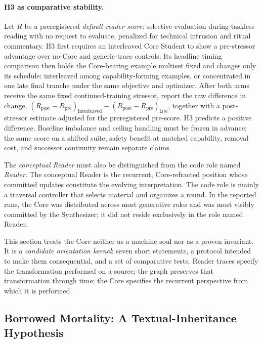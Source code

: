 \paragraph{H3 as comparative stability.} Let $R$ be a preregistered
\emph{default-reader score}: selective evaluation during taskless reading with no
request to evaluate, penalized for technical intrusion and ritual commentary.
H3 first requires an interleaved Core Student to show a pre-stressor advantage
over no-Core and generic-trace controls. Its headline timing comparison then
holds the Core-bearing example multiset fixed and changes only its schedule:
interleaved among capability-forming examples, or concentrated in one late final
tranche under the same objective and optimizer. After both arms receive the same
fixed continued-training stressor, report the raw difference in change,
$(R_{\mathrm{post}}-R_{\mathrm{pre}})_{\mathrm{interleaved}}-
(R_{\mathrm{post}}-R_{\mathrm{pre}})_{\mathrm{late}}$, together with a
post-stressor estimate adjusted for the preregistered pre-score. H3 predicts a
positive difference. Baseline imbalance and ceiling handling must be frozen in
advance; the same score on a shifted suite, safety benefit at matched capability,
removal cost, and successor continuity remain separate claims.

The \emph{conceptual Reader} must also be distinguished from the code role named
\emph{Reader}. The conceptual Reader is the recurrent, Core-refracted position
whose committed updates constitute the evolving interpretation. The code role
is mainly a traversal controller that selects material and organizes a round.
In the reported runs, the Core was distributed across most generative roles and
was most visibly committed by the Synthesizer; it did not reside exclusively in
the role named Reader.

This section treats the Core neither as a machine soul nor as a proven
invariant. It is a \emph{candidate orientation kernel}: seven short statements,
a protocol intended to make them consequential, and a set of comparative
tests. Reader traces specify the transformation performed on a source; the
graph preserves that transformation through time; the Core specifies the
recurrent perspective from which it is performed.

\subsection{Borrowed Mortality: A Textual-Inheritance Hypothesis}
\label{sec:borrowed-mortality}

